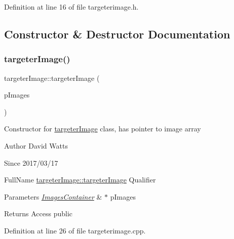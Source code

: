 Definition at line 16 of file targeterimage.\+h.



\subsection{Constructor \& Destructor Documentation}
\mbox{\label{classtargeter_image_a2a82f686b73602837e2fb304ce37861d}} 
\subsubsection{\texorpdfstring{targeter\+Image()}{targeterImage()}\hspace{0.1cm}{\footnotesize\ttfamily [1/2]}}
{\footnotesize\ttfamily targeter\+Image\+::targeter\+Image (\begin{DoxyParamCaption}\item[{\hyperlink{class_images_container}{Images\+Container} $\ast$}]{p\+Images }\end{DoxyParamCaption})}

Constructor for \hyperlink{classtargeter_image}{targeter\+Image} class, has pointer to image array

\begin{DoxyAuthor}{Author}
David Watts 
\end{DoxyAuthor}
\begin{DoxySince}{Since}
2017/03/17
\end{DoxySince}
Full\+Name \hyperlink{classtargeter_image_a2a82f686b73602837e2fb304ce37861d}{targeter\+Image\+::targeter\+Image} Qualifier 
\begin{DoxyParams}{Parameters}
{\em \hyperlink{class_images_container}{Images\+Container}} & $\ast$ p\+Images \\
\hline
\end{DoxyParams}
\begin{DoxyReturn}{Returns}
Access public 
\end{DoxyReturn}


Definition at line 26 of file targeterimage.\+cpp.

\mbox{\label{classtargeter_image_a5fadb46e9235423e05b42e301b33c83f}} 
